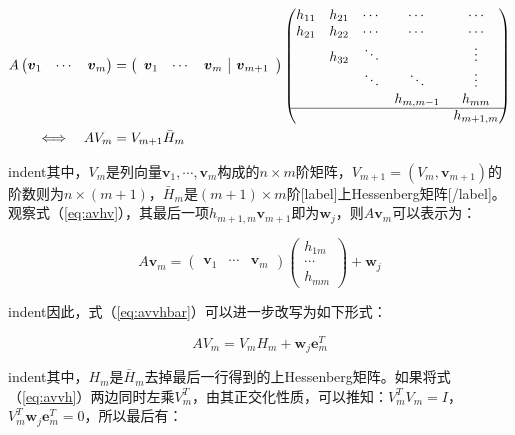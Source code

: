 \documentclass[UTF8,nofonts]{ctexart}
\begin{document}
\begin{align}
\label{eq:avvhbar}
\begin{split}
A\begin{pmatrix}\boldsymbol{v}_1 & \cdots & \boldsymbol{v}_m \end{pmatrix} &=
\begin{pmatrix}\begin{array}{ccc|c}\boldsymbol{v}_1 & \cdots & \boldsymbol{v}_{m} & \boldsymbol{v}_{m+1}\end{array}\end{pmatrix}
\begin{pmatrix}
h_{11} & h_{21} & \cdots & \cdots & \cdots \\
h_{21} & h_{22} & \cdots & \cdots & \cdots \\
& h_{32} & \ddots &  & \vdots \\
& & \ddots & \ddots & \vdots \\
& & & h_{m,m-1} & h_{mm} \\
\cline{1-5}
& & & & h_{m+1,m}
\end{pmatrix} \\
\Longleftrightarrow\quad AV_m&=V_{m+1}\bar{H}_m
\end{split}
\end{align}

indent其中，$V_m$是列向量$\boldsymbol{v}_1,\cdots,\boldsymbol{v}_m$构成的$n \times m$阶矩阵，$V_{m+1}=\left(V_m,\boldsymbol{v}_{m+1}\right)$的阶数则为$n \times (m+1)$，$\bar{H}_m$是$(m+1) \times m$阶[label]上Hessenberg矩阵[/label]。观察式（\ref{eq:avhv}），其最后一项$h_{m+1,m}\boldsymbol{v}_{m+1}$即为$\boldsymbol{w}_j$，则$A\boldsymbol{v}_m$可以表示为：

\[A\boldsymbol{v}_m=\begin{pmatrix}\boldsymbol{v}_1&\cdots&\boldsymbol{v}_m\end{pmatrix}\begin{pmatrix}h_{1m}\\\cdots\\h_{mm}\end{pmatrix}+\boldsymbol{w}_j\]

indent因此，式（\ref{eq:avvhbar}）可以进一步改写为如下形式：

\begin{equation}
\label{eq:avvh}
AV_m=V_mH_m+\boldsymbol{w}_j\boldsymbol{e}_m^T
\end{equation}

indent其中，$H_m$是$\bar{H}_m$去掉最后一行得到的上Hessenberg矩阵。如果将式（\ref{eq:avvh}）两边同时左乘$V_m^T$，由其正交化性质，可以推知：$V^T_mV_m=I$，$V^T_m\boldsymbol{w}_j\boldsymbol{e}_m^T=0$，所以最后有：
\end{document}
